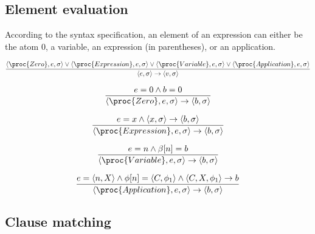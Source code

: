 \subsection{Element evaluation}

According to the syntax specification, an element of an expression can either
be the atom $0$, a variable, an expression (in parentheses), or an application. 

\begin{equation}
{\displaystyle
  \left\langle \proc{Zero}, e,\sigma\right\rangle
\vee 
  \left\langle \proc{Expression}, e,\sigma\right\rangle
\vee
  \left\langle \proc{Variable}, e,\sigma\right\rangle
\vee
  \left\langle \proc{Application}, e,\sigma\right\rangle
\over\displaystyle
  \left\langle e,\sigma\right\rangle
  \rightarrow
  \left\langle v,\sigma\right\rangle
}
\end{equation}

\begin{equation}
{\displaystyle
  e = 0
\wedge
  b = 0
\over\displaystyle
  \left\langle \proc{Zero}, e,\sigma\right\rangle
  \rightarrow
  \left\langle b,\sigma\right\rangle
}
\end{equation}

\begin{equation}
{\displaystyle
  e = x
\wedge
  \left\langle x,\sigma\right\rangle
  \rightarrow
  \left\langle b,\sigma\right\rangle
\over\displaystyle
  \left\langle \proc{Expression}, e,\sigma\right\rangle
  \rightarrow
  \left\langle b,\sigma\right\rangle
}
\end{equation}

\begin{equation}
{\displaystyle
  e = n
\wedge
  \beta[n]=b
\over\displaystyle
  \left\langle \proc{Variable}, e,\sigma\right\rangle
  \rightarrow
  \left\langle b,\sigma\right\rangle
}
\end{equation}

\begin{equation}
{\displaystyle
  e = \left\langle n, X\right\rangle
\wedge
  \phi[n]=\left\langle C,\phi_1 \right\rangle
\wedge
  \left\langle C,X,\phi_1\right\rangle
  \rightarrow
  b
\over\displaystyle
  \left\langle \proc{Application}, e,\sigma\right\rangle
  \rightarrow
  \left\langle b,\sigma\right\rangle
}
\end{equation}

\subsection{Clause matching}

